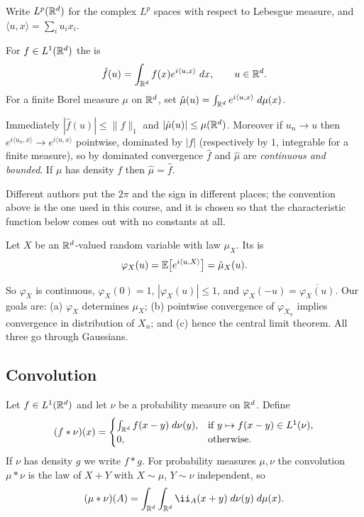\documentclass[a4paper]{scrartcl}
\newcommand{\ip}[2]{\langle #1, #2 \rangle}
\newcommand{\ind}{\ii}
\begin{document}
Write $L^p(\mathbb{R}^d)$ for the complex $L^p$ spaces with respect to Lebesgue measure, and $\ip{u}{x}=\sum_i u_ix_i$.

\begin{definition}
	For $f \in L^1(\mathbb{R}^d)$ the  is
	$$
	\hat f(u) = \int_{\R^d} f(x)e^{i\ip{u}{x}}\dd x, \qquad u \in \R^d.
	$$
	For a finite Borel measure $\mu$ on $\mathbb{R}^d$, set $\hat\mu(u)=\int_{\R^d}e^{i\ip{u}{x}}\dd\mu(x)$.
\end{definition}

\begin{remark}
	Immediately $|\hat f(u)| \leq \|f\|_1$ and $|\hat\mu(u)|\leq\mu(\mathbb{R}^d)$. Moreover if $u_n \to u$ then $e^{i\ip{u_n}{x}}\to e^{i\ip{u}{x}}$ pointwise, dominated by $|f|$ (respectively by $1$, integrable for a finite measure), so by dominated convergence $\hat f$ and $\hat\mu$ are \emph{continuous and bounded}. If $\mu$ has density $f$ then $\hat\mu = \hat f$.

	Different authors put the $2\pi$ and the sign in different places; the convention above is the one used in this course, and it is chosen so that the characteristic function below comes out with no constants at all.
\end{remark}

\begin{definition}
	Let $X$ be an $\mathbb{R}^d$-valued random variable with law $\mu_X$. Its  is
	$$
	\varphi_X(u) = \EE\big[e^{i\ip{u}{X}}\big] = \hat\mu_X(u).
	$$
\end{definition}

So $\varphi_X$ is continuous, $\varphi_X(0)=1$, $|\varphi_X(u)|\leq1$, and $\varphi_X(-u)=\overline{\varphi_X(u)}$. Our goals are: (a) $\varphi_X$ determines $\mu_X$; (b) pointwise convergence of $\varphi_{X_n}$ implies convergence in distribution of $X_n$; and (c) hence the central limit theorem. All three go through Gaussians.

\subsection{Convolution}

\begin{definition}[Convolution]
	Let $f \in L^1(\mathbb{R}^d)$ and let $\nu$ be a probability measure on $\mathbb{R}^d$. Define
	$$
	(f*\nu)(x) = \begin{cases}\int_{\mathbb{R}^d}f(x-y)\; d\nu(y), & \text{if } y\mapsto f(x-y) \in L^1(\nu),\\ 0,&\text{otherwise.}\end{cases}
	$$
	If $\nu$ has density $g$ we write $f * g$. For probability measures $\mu,\nu$ the convolution $\mu*\nu$ is the law of $X+Y$ with $X\sim\mu$, $Y\sim\nu$ independent, so
	$$
	(\mu*\nu)(A) = \int_{\R^d}\int_{\R^d}\ind_A(x+y)\dd\nu(y)\dd\mu(x).
	$$
\end{definition}
\end{document}
